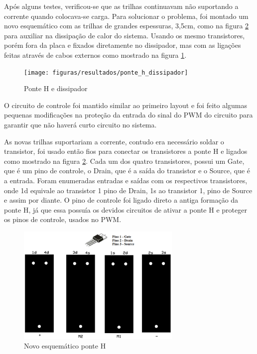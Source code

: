 Após alguns testes, verificou-se que as trilhas continuavam não suportando a corrente quando colocava-se carga. Para solucionar o problema, foi montado um novo esquemático com as trilhas de grandes espessuras, 3,5cm, como na figura \ref{fig:novo_esquematico_ponte_h} para auxiliar na dissipação de calor do sistema. Usando os mesmo transistores, porém fora da placa e fixados diretamente no dissipador, mas com as ligações feitas através de cabos externos como mostrado na figura \ref{fig:ponte_h_dissipador}.

\begin{figure}[!ht]
  \center
  \texttt{[image: figuras/resultados/ponte\_h\_dissipador]}
  \caption{Ponte H e dissipador}
  \label{fig:ponte_h_dissipador}
\end{figure}


O circuito de controle foi mantido similar ao primeiro layout e foi feito algumas pequenas modificações na proteção da entrada do sinal do PWM do circuito para garantir que não haverá curto circuito no sistema.

As novas trilhas suportariam a corrente, contudo era necessário soldar o transistor, foi usado então fios para conectar os transistores a ponte H e ligados como mostrado na figura \ref{fig:novo_esquematico_ponte_h}. Cada um dos quatro transistores, possui um Gate, que é um pino de controle, o Drain, que é a saída do transistor e o Source, que é a entrada. Foram enumeradas entradas e saídas com os respectivos transistores, onde 1d equivale ao transistor 1 pino de Drain, 1s ao transistor 1, pino de Source e assim por diante. O pino de controle foi ligado direto a antiga formação da ponte H, já que essa possuía os devidos circuitos de ativar a ponte H e proteger os pinos de controle, usados no PWM.

\begin{figure}[!ht]
  \center
  \includegraphics[width=0.7\textwidth]{figuras/resultados/novo_esquematico_ponte_h}
  \caption{Novo esquemático ponte H}
  \label{fig:novo_esquematico_ponte_h}
\end{figure}


